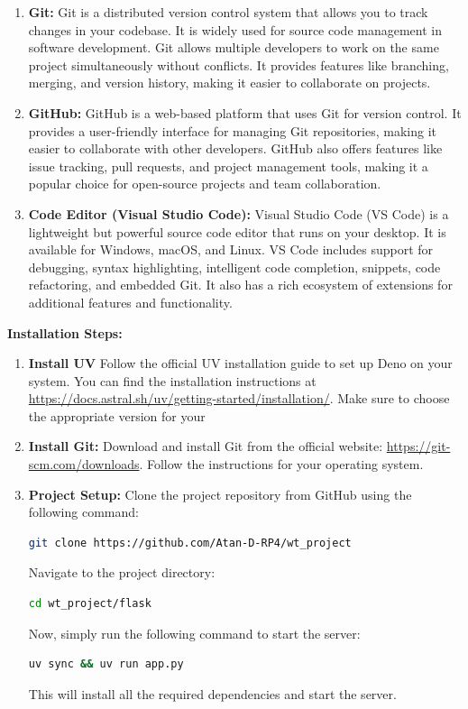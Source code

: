 \begin{enumerate}
  \item \textbf{Git:}
    Git is a distributed version control system that allows you to track
    changes in your codebase. It is widely used for source code management in
    software development. Git allows multiple developers to work on the same
    project simultaneously without conflicts. It provides features like
    branching, merging, and version history, making it easier to collaborate on
    projects.

  \item \textbf{GitHub:}
    GitHub is a web-based platform that uses Git for version control. It
    provides a user-friendly interface for managing Git repositories, making it
    easier to collaborate with other developers. GitHub also offers features
    like issue tracking, pull requests, and project management tools, making it
    a popular choice for open-source projects and team collaboration.

  \item \textbf{Code Editor (Visual Studio Code):}
    Visual Studio Code (VS Code) is a lightweight but powerful source code
    editor that runs on your desktop. It is available for Windows, macOS, and
    Linux. VS Code includes support for debugging, syntax highlighting,
    intelligent code completion, snippets, code refactoring, and embedded
    Git. It also has a rich ecosystem of extensions for additional features
    and functionality.
\end{enumerate}

\textbf{Installation Steps:}
\begin{enumerate}
  \item \textbf{Install UV}
    Follow the official UV installation guide to set up Deno on your system.
    You can find the installation instructions at
    \url{https://docs.astral.sh/uv/getting-started/installation/}.
    Make sure to choose the appropriate version for your

  \item \textbf{Install Git:}
    Download and install Git from the official website:
    \url{https://git-scm.com/downloads}. Follow the instructions for your
    operating system.

  \item \textbf{Project Setup:}
    Clone the project repository from GitHub using the following command:
    \begin{lstlisting}[language=bash]
        git clone https://github.com/Atan-D-RP4/wt_project
    \end{lstlisting}
    Navigate to the project directory:
    \begin{lstlisting}[language=bash]
        cd wt_project/flask
    \end{lstlisting}
    Now, simply run the following command to start the server:
    \begin{lstlisting}[language=bash]
        uv sync && uv run app.py
    \end{lstlisting}
    This will install all the required dependencies and start the server.
\end{enumerate}


